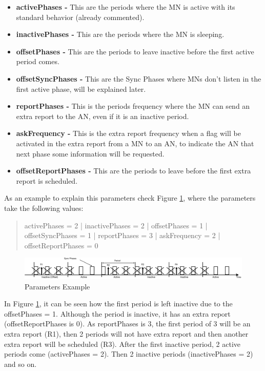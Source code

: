 \begin{itemize}
 \item \textbf{activePhases -} This are the periods where the \ac{MN} is active with its standard behavior (already commented).
 \item \textbf{inactivePhases -} This are the periods where the \ac{MN} is sleeping.
 \item \textbf{offsetPhases -} This are the periods to leave inactive before the first active period comes.
 \item \textbf{offsetSyncPhases -} This are the Sync Phases where \acp{MN} don't listen in the first active phase, will be explained later.
 \item \textbf{reportPhases -} This is the periods frequency where the \ac{MN} can send an extra report to the \ac{AN}, even if it is 
an inactive period.
 \item \textbf{askFrequency -} This is the extra report frequency when a flag will be activated in the extra report from a \ac{MN} to 
an \ac{AN}, to indicate the \ac{AN} that next phase some information will be requested.
 \item \textbf{offsetReportPhases -} This are the periods to leave before the first extra report is scheduled.
\end{itemize}
 
As an example to explain this parameters check Figure \ref{fig:parametersphases}, where the parameters take the following values: 

\begin{quote}
 activePhases = 2 | inactivePhases = 2 | offsetPhases = 1 | offsetSyncPhases = 1 | reportPhases = 3 | askFrequency = 2 | offsetReportPhases = 0
\end{quote}

\begin{figure}[ht]
 \begin{center}
  \includegraphics[width=1\textwidth]{parametersphases.eps}
 \end{center}
 \caption{Parameters Example}
 \label{fig:parametersphases}
\end{figure}

In Figure \ref{fig:parametersphases}, it can be seen how the first period is left inactive due to the offsetPhases = 1. Although the period
is inactive, it has an extra report (offsetReportPhases is 0). As reportPhases is 3, the first period of 3 will be an extra report (R1), 
then 2 periods will not have extra report and then another extra report will be scheduled (R3). After the first inactive period, 2 active 
periods come (activePhases = 2). Then 2 inactive periods (inactivePhases = 2) and so on.

